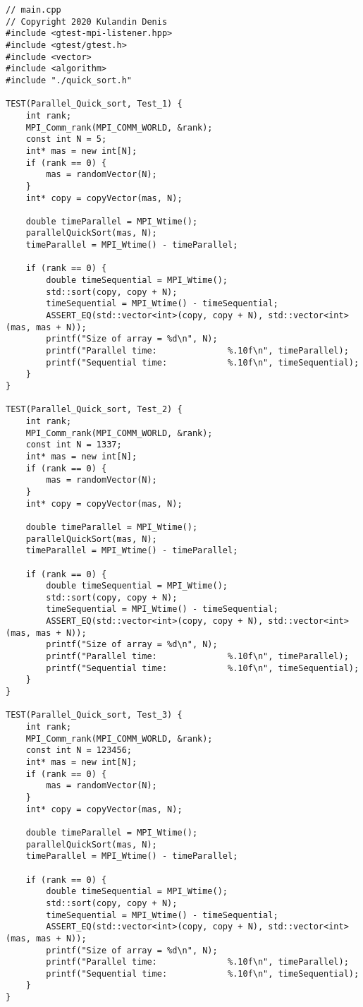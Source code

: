\documentclass{report}
\begin{document}
\begin{lstlisting}
// main.cpp
// Copyright 2020 Kulandin Denis
#include <gtest-mpi-listener.hpp>
#include <gtest/gtest.h>
#include <vector>
#include <algorithm>
#include "./quick_sort.h"

TEST(Parallel_Quick_sort, Test_1) {
    int rank;
    MPI_Comm_rank(MPI_COMM_WORLD, &rank);
    const int N = 5;
    int* mas = new int[N];
    if (rank == 0) {
        mas = randomVector(N);
    }
    int* copy = copyVector(mas, N);

    double timeParallel = MPI_Wtime();
    parallelQuickSort(mas, N);
    timeParallel = MPI_Wtime() - timeParallel;

    if (rank == 0) {
        double timeSequential = MPI_Wtime();
        std::sort(copy, copy + N);
        timeSequential = MPI_Wtime() - timeSequential;
        ASSERT_EQ(std::vector<int>(copy, copy + N), std::vector<int>(mas, mas + N));
        printf("Size of array = %d\n", N);
        printf("Parallel time:              %.10f\n", timeParallel);
        printf("Sequential time:            %.10f\n", timeSequential);
    }
}

TEST(Parallel_Quick_sort, Test_2) {
    int rank;
    MPI_Comm_rank(MPI_COMM_WORLD, &rank);
    const int N = 1337;
    int* mas = new int[N];
    if (rank == 0) {
        mas = randomVector(N);
    }
    int* copy = copyVector(mas, N);

    double timeParallel = MPI_Wtime();
    parallelQuickSort(mas, N);
    timeParallel = MPI_Wtime() - timeParallel;

    if (rank == 0) {
        double timeSequential = MPI_Wtime();
        std::sort(copy, copy + N);
        timeSequential = MPI_Wtime() - timeSequential;
        ASSERT_EQ(std::vector<int>(copy, copy + N), std::vector<int>(mas, mas + N));
        printf("Size of array = %d\n", N);
        printf("Parallel time:              %.10f\n", timeParallel);
        printf("Sequential time:            %.10f\n", timeSequential);
    }
}

TEST(Parallel_Quick_sort, Test_3) {
    int rank;
    MPI_Comm_rank(MPI_COMM_WORLD, &rank);
    const int N = 123456;
    int* mas = new int[N];
    if (rank == 0) {
        mas = randomVector(N);
    }
    int* copy = copyVector(mas, N);

    double timeParallel = MPI_Wtime();
    parallelQuickSort(mas, N);
    timeParallel = MPI_Wtime() - timeParallel;

    if (rank == 0) {
        double timeSequential = MPI_Wtime();
        std::sort(copy, copy + N);
        timeSequential = MPI_Wtime() - timeSequential;
        ASSERT_EQ(std::vector<int>(copy, copy + N), std::vector<int>(mas, mas + N));
        printf("Size of array = %d\n", N);
        printf("Parallel time:              %.10f\n", timeParallel);
        printf("Sequential time:            %.10f\n", timeSequential);
    }
}


\end{lstlisting}
\end{document}
